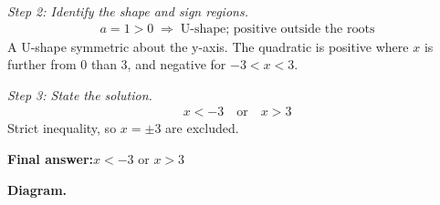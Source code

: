 \documentclass[11pt]{article}
\begin{document}
\textit{Step 2: Identify the shape and sign regions.}
\[\begin{gathered}
a = 1 > 0 \;\Longrightarrow\; \text{U-shape; positive outside the roots}
\end{gathered}\]
A U-shape symmetric about the y-axis. The quadratic is positive where \( x \) is further from 0 than 3, and negative for \( -3 < x < 3 \).

\textit{Step 3: State the solution.}
\[\begin{gathered}
x < -3 \quad \text{or} \quad x > 3
\end{gathered}\]
Strict inequality, so \( x = \pm 3 \) are excluded.

\begin{answerbox}
\textbf{Final answer:}\quad \(\displaystyle x < -3\) or \(\displaystyle x > 3\)
\end{answerbox}
\textbf{Diagram.}
\end{document}
